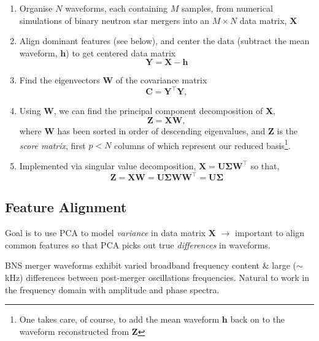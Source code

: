 \documentclass[a0,landscape]{a0poster}
\newcommand{\matr}[1]{\mathbf{#1}}
\newcommand{\tran}[1]{#1^{\top}}
\begin{document}
\begin{multicols}{4}
\begin{enumerate}
    \item Organise $N$ waveforms, each containing $M$ samples, from
        numerical simulations of binary neutron star mergers into an $M\times N$
        data matrix, $\matr{X}$
    \item Align dominant features (see below), and center the data (subtract the
        mean waveform, $\matr{h}$) to get centered data matrix
        \begin{equation}
        \matr{Y}=\matr{X}-\matr{h}
    \end{equation}
    \item Find the eigenvectors $\matr{W}$ of the covariance matrix
        \begin{equation}
        \matr{C} = \tran{\matr{Y}}\matr{Y},
    \end{equation}
\item Using $\matr{W}$, we can find the principal component
        decomposition of $\matr{X}$,
        \begin{equation}\label{eq:pca}
            \matr{Z} = \matr{X} \matr{W},
        \end{equation}
        where $\matr{W}$ has been sorted in order of descending eigenvalues, and
        $\matr{Z}$ is the \emph{score matrix}, first $p<N$ columns of
        which represent our reduced basis\footnote{One takes care, of course, to
        add the mean waveform $\matr{h}$ back on to the waveform reconstructed
    from $\matr{Z}$}.
    \item Implemented via singular value decomposition, $\matr{X} =
        \matr{U}\matr{\Sigma}\tran{\matr{W}}$ so that,
        \begin{equation}
            \matr{Z} = \matr{X} \matr{W} =
            \matr{U}\matr{\Sigma}\matr{W}\tran{\matr{W}} = \matr{U}\matr{\Sigma}
        \end{equation}
\end{enumerate}


\vspace{9cm}
\subsection*{\centering Feature Alignment}
Goal is to use PCA to model \emph{variance} in data matrix $\matr{X}$
$\rightarrow$ important to align common features so that PCA picks out true
\emph{differences} in waveforms.

BNS merger waveforms exhibit varied broadband frequency content \& large
($\sim$\,kHz) differences between post-merger oscillations frequencies.  Natural
to work in the frequency domain with amplitude and phase spectra.


\end{multicols}
\end{document}
